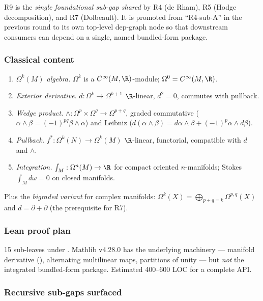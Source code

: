 R9 is the \emph{single foundational sub-gap shared} by R4 (de Rham),
R5 (Hodge decomposition), and R7 (Dolbeault).  It is promoted from
``R4-sub-A'' in the previous round to its own top-level dep-graph node
so that downstream consumers can depend on a single, named
bundled-form package.

\subsubsection*{Classical content}

\begin{enumerate}
\item \emph{\(\Omega^{k}(M)\) algebra.}  \(\Omega^{k}\) is a
  \(C^{\infty}(M, \R)\)-module; \(\Omega^{0} = C^{\infty}(M, \R)\).
\item \emph{Exterior derivative.}  \(d : \Omega^{k} \to \Omega^{k+1}\)
  \(\R\)-linear, \(d^{2} = 0\), commutes with pullback.
\item \emph{Wedge product.}  \(\wedge : \Omega^{p} \times \Omega^{q}
  \to \Omega^{p+q}\), graded commutative
  (\(\alpha \wedge \beta = (-1)^{pq} \beta \wedge \alpha\)) and Leibniz
  (\(d(\alpha \wedge \beta) = d\alpha \wedge \beta + (-1)^{p}
  \alpha \wedge d\beta\)).
\item \emph{Pullback.}  \(f^{*} : \Omega^{k}(N) \to \Omega^{k}(M)\)
  \(\R\)-linear, functorial, compatible with \(d\) and \(\wedge\).
\item \emph{Integration.}  \(\int_{M} : \Omega^{n}(M) \to \R\) for
  compact oriented \(n\)-manifolds; Stokes \(\int_{M} d\omega = 0\) on
  closed manifolds.
\end{enumerate}

Plus the \emph{bigraded variant} for complex manifolds:
\(\Omega^{k}(X) = \bigoplus_{p+q=k} \Omega^{p,q}(X)\) and
\(d = \partial + \bar\partial\) (the prerequisite for R7).

\subsubsection*{Lean proof plan}

15 sub-leaves under
.  Mathlib v4.28.0 has
the underlying machinery --- manifold derivative (),
alternating multilinear maps, partitions of unity --- but \emph{not} the
integrated bundled-form package.  Estimated 400--600 LOC for a complete
API.

\subsubsection*{Recursive sub-gaps surfaced}

